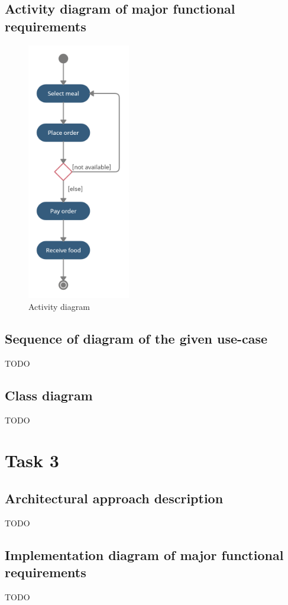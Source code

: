 \documentclass[a4paper]{article}
\numberwithin{equation}{section}
\begin{document}
\subsection{Activity diagram of major functional requirements}
\begin{figure}[H]
  \centering
  \includegraphics[width=0.4\textwidth]{./assets/t2/Activity_Diagram.png}
  \caption{Activity diagram}
\end{figure}

\subsection{Sequence of diagram of the given use-case}
TODO

\subsection{Class diagram}
TODO

\section{Task 3}
\subsection{Architectural approach description}
TODO

\subsection{Implementation diagram of major functional requirements}
TODO
\end{document}
